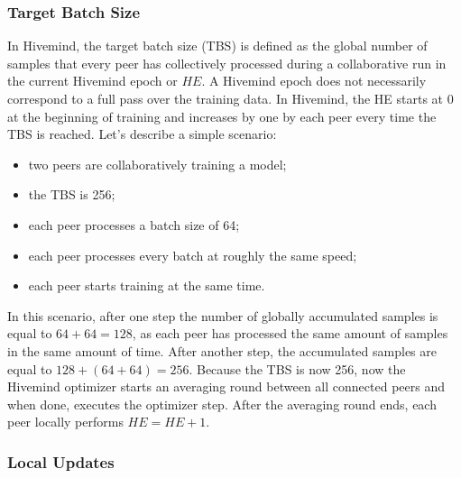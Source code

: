 \subsubsection{Target Batch Size}

In Hivemind, the target batch size (TBS) is defined as the global number of samples that every peer has collectively processed during a collaborative run in the current Hivemind epoch or $HE$.
A Hivemind epoch does not necessarily correspond to a full pass over the training data.
In Hivemind, the HE starts at 0 at the beginning of training and increases by one by each peer every time the TBS is reached.
Let's describe a simple scenario:
\begin{itemize}
    \item two peers are collaboratively training a model;
    \item the TBS is 256;
    \item each peer processes a batch size of 64;
    \item each peer processes every batch at roughly the same speed;
    \item each peer starts training at the same time.
\end{itemize}
In this scenario, after one step the number of globally accumulated samples is equal to $64+64=128$, as each peer has processed the same amount of samples in the same amount of time.
After another step, the accumulated samples are equal to $128+(64+64)=256$.
Because the TBS is now 256, now the Hivemind optimizer starts an averaging round between all connected peers and when done, executes the optimizer step.
After the averaging round ends, each peer locally performs $HE=HE+1$.

\subsubsection{Local Updates}


